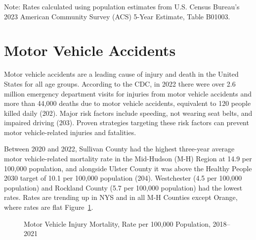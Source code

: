 \documentclass[
  english,
  letterpaper,
]{report}
\begin{document}
\begin{tcolorbox}[enhanced jigsaw, breakable, leftrule=.75mm, title=\textcolor{quarto-callout-note-color}{\faInfo}\hspace{0.5em}{Note}, bottomrule=.15mm, opacityback=0, left=2mm, colback=white, bottomtitle=1mm, coltitle=black, colbacktitle=quarto-callout-note-color!10!white, colframe=quarto-callout-note-color-frame, opacitybacktitle=0.6, toptitle=1mm, titlerule=0mm, arc=.35mm, rightrule=.15mm, toprule=.15mm]

Note: Rates calculated using population estimates from U.S. Census
Bureau's 2023 American Community Survey (ACS) 5-Year Estimate, Table
B01003.

\end{tcolorbox}

\section{Motor Vehicle Accidents}\label{motor-vehicle-accidents}

Motor vehicle accidents are a leading cause of injury and death in the
United States for all age groups. According to the CDC, in 2022 there
were over 2.6 million emergency department visits for injuries from
motor vehicle accidents and more than 44,000 deaths due to motor vehicle
accidents, equivalent to 120 people killed daily (202). Major risk
factors include speeding, not wearing seat belts, and impaired driving
(203). Proven strategies targeting these risk factors can prevent motor
vehicle-related injuries and fatalities.

Between 2020 and 2022, Sullivan County had the highest three-year
average motor vehicle-related mortality rate in the Mid-Hudson (M-H)
Region at 14.9 per 100,000 population, and alongside Ulster County it
was above the Healthy People 2030 target of 10.1 per 100,000 population
(204). Westchester (4.5 per 100,000 population) and Rockland County (5.7
per 100,000 population) had the lowest rates. Rates are trending up in
NYS and in all M-H Counties except Orange, where rates are flat
Figure~\ref{fig-mva-mortal-rate}.

\begin{figure}


\caption{\label{fig-mva-mortal-rate}Motor Vehicle Injury Mortality, Rate
per 100,000 Population, 2018--2021}

\end{figure}%
\end{document}
